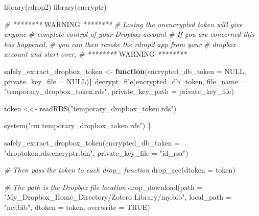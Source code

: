 \documentclass[
]{book}
\newenvironment{Shaded}{\begin{snugshade}}{\end{snugshade}}
\newcommand{\AlertTok}[1]{\textcolor[rgb]{0.94,0.16,0.16}{#1}}
\newcommand{\AttributeTok}[1]{\textcolor[rgb]{0.77,0.63,0.00}{#1}}
\newcommand{\CommentTok}[1]{\textcolor[rgb]{0.56,0.35,0.01}{\textit{#1}}}
\newcommand{\ConstantTok}[1]{\textcolor[rgb]{0.00,0.00,0.00}{#1}}
\newcommand{\ControlFlowTok}[1]{\textcolor[rgb]{0.13,0.29,0.53}{\textbf{#1}}}
\newcommand{\FunctionTok}[1]{\textcolor[rgb]{0.00,0.00,0.00}{#1}}
\newcommand{\NormalTok}[1]{#1}
\newcommand{\OtherTok}[1]{\textcolor[rgb]{0.56,0.35,0.01}{#1}}
\newcommand{\StringTok}[1]{\textcolor[rgb]{0.31,0.60,0.02}{#1}}
\begin{document}
\begin{Shaded}
\begin{Highlighting}[]
\FunctionTok{library}\NormalTok{(rdrop2)}
\FunctionTok{library}\NormalTok{(encryptr)}
 
\CommentTok{\# ******** }\AlertTok{WARNING}\CommentTok{ ********}
\CommentTok{\# Losing the unencrypted token will give anyone }
\CommentTok{\# complete control of your Dropbox account}
\CommentTok{\# If you are concerned this has happened,}
\CommentTok{\# you can then revoke the rdrop2 app from your}
\CommentTok{\# dropbox account and start over.}
\CommentTok{\# ******** }\AlertTok{WARNING}\CommentTok{ ********}
 
 
\NormalTok{safely\_extract\_dropbox\_token }\OtherTok{\textless{}{-}} \ControlFlowTok{function}\NormalTok{(}\AttributeTok{encrypted\_db\_token =} \ConstantTok{NULL}\NormalTok{, }
                                         \AttributeTok{private\_key\_file =} \ConstantTok{NULL}\NormalTok{)\{}
  \FunctionTok{decrypt\_file}\NormalTok{(encrypted\_db\_token, }
               \AttributeTok{file\_name =} \StringTok{"temporary\_dropbox\_token.rds"}\NormalTok{, }
               \AttributeTok{private\_key\_path =}\NormalTok{ private\_key\_file)}
  
\NormalTok{  token }\OtherTok{\textless{}\textless{}{-}} \FunctionTok{readRDS}\NormalTok{(}\StringTok{"temporary\_dropbox\_token.rds"}\NormalTok{)}
  
  \FunctionTok{system}\NormalTok{(}\StringTok{"rm temporary\_dropbox\_token.rds"}\NormalTok{)}
\NormalTok{\}}
 
\FunctionTok{safely\_extract\_dropbox\_token}\NormalTok{(}\AttributeTok{encrypted\_db\_token =} \StringTok{"droptoken.rds.encryptr.bin"}\NormalTok{, }
                             \AttributeTok{private\_key\_file =} \StringTok{"id\_rsa"}\NormalTok{)}
 
\CommentTok{\# Then pass the token to each drop\_ function}
\FunctionTok{drop\_acc}\NormalTok{(}\AttributeTok{dtoken =}\NormalTok{ token)}
 
\CommentTok{\# The path is the Dropbox file location}
\FunctionTok{drop\_download}\NormalTok{(}\AttributeTok{path =} \StringTok{"My\_Dropbox\_Home\_Directory/Zotero Library/my.bib"}\NormalTok{, }
              \AttributeTok{local\_path =} \StringTok{"my.bib"}\NormalTok{, }
              \AttributeTok{dtoken =}\NormalTok{ token,}
              \AttributeTok{overwrite =} \ConstantTok{TRUE}\NormalTok{)}
\end{Highlighting}
\end{Shaded}
\end{document}
